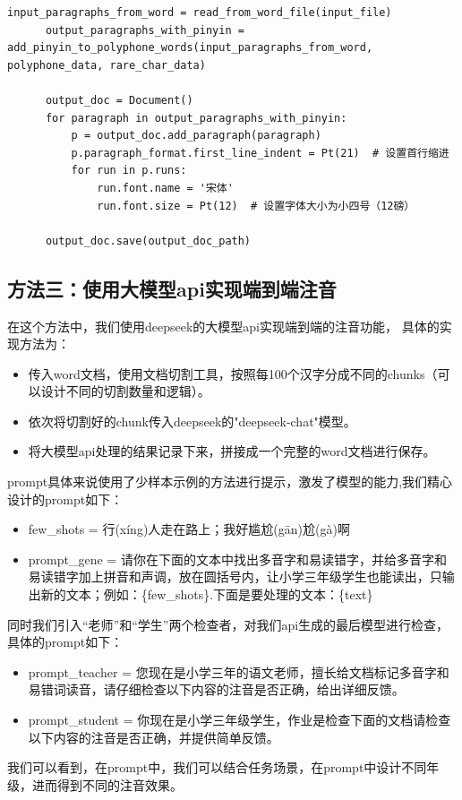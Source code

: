 \documentclass[12pt,hyperref,a4paper,UTF8]{ctexart}
\begin{document}
\begin{enumerate}
\begin{lstlisting}[caption={注音处理与文件保存实现代码}, label={lst:example}]
      input_paragraphs_from_word = read_from_word_file(input_file)
      output_paragraphs_with_pinyin = add_pinyin_to_polyphone_words(input_paragraphs_from_word, polyphone_data, rare_char_data)
  
      output_doc = Document()
      for paragraph in output_paragraphs_with_pinyin:
          p = output_doc.add_paragraph(paragraph)
          p.paragraph_format.first_line_indent = Pt(21)  # 设置首行缩进
          for run in p.runs:
              run.font.name = '宋体'
              run.font.size = Pt(12)  # 设置字体大小为小四号（12磅）
  
      output_doc.save(output_doc_path)
  \end{lstlisting}
\end{enumerate}

\subsection{方法三：使用大模型api实现端到端注音}
在这个方法中，我们使用deepseek的大模型api实现端到端的注音功能，
具体的实现方法为：
\begin{itemize}
    \item 传入word文档，使用文档切割工具，按照每100个汉字分成不同的chunks（可以设计不同的切割数量和逻辑）。
    \item 依次将切割好的chunk传入deepseek的"deepseek-chat"模型。
    \item 将大模型api处理的结果记录下来，拼接成一个完整的word文档进行保存。
\end{itemize}
prompt具体来说使用了少样本示例的方法进行提示，激发了模型的能力,我们精心设计的prompt如下：
\begin{itemize}
    \item few\_shots = 行(xíng)人走在路上；我好尴尬(gān)尬(gà)啊
    \item prompt\_gene = 请你在下面的文本中找出多音字和易读错字，并给多音字和易读错字加上拼音和声调，放在圆括号内，让小学三年级学生也能读出，只输出新的文本；例如：\{few\_shots\}.下面是要处理的文本：\{text\}
\end{itemize}
同时我们引入“老师”和“学生”两个检查者，对我们api生成的最后模型进行检查，具体的prompt如下：
\begin{itemize}
    \item prompt\_teacher = 您现在是小学三年的语文老师，擅长给文档标记多音字和易错词读音，请仔细检查以下内容的注音是否正确，给出详细反馈。
    \item prompt\_student = 你现在是小学三年级学生，作业是检查下面的文档请检查以下内容的注音是否正确，并提供简单反馈。
\end{itemize}
我们可以看到，在prompt中，我们可以结合任务场景，在prompt中设计不同年级，进而得到不同的注音效果。
\end{document}
